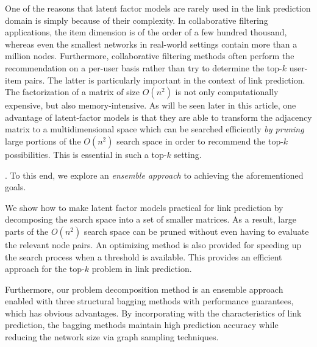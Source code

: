 One of the reasons that latent factor models are rarely used in the
link prediction domain is simply because of their complexity. In
collaborative filtering applications, the item dimension is of the
order of a few hundred thousand, whereas even the smallest networks
in real-world settings contain more than a million nodes.
Furthermore, collaborative filtering methods  often perform the
recommendation on a per-user basis rather than try to determine
the top-$k$ user-item pairs.  The latter is particularly important
in the context of link prediction. The factorization of a matrix of
size $O(n^2)$ is not only computationally expensive, but also
memory-intensive.  As will be seen later in this article, one advantage
of  latent-factor models is that they are able to  transform the
adjacency matrix to a multidimensional space which can be searched
efficiently {\em by pruning} large portions of the $O(n^2)$ search
space in order to recommend the top-$k$ possibilities.
This is essential in such a top-$k$ setting.

. To this end, we explore an {\em ensemble approach} to
achieving the aforementioned goals.

We show how to make latent factor models
practical for link prediction by decomposing the search space into a
 set of smaller matrices. As a result, large parts of the $O(n^2)$
search space can be pruned without even having to evaluate the
relevant node pairs. An optimizing method is also provided for
speeding up the search process when a threshold is available.
This provides an efficient approach for the
top-$k$ problem in link prediction.

Furthermore, our problem decomposition method is an ensemble approach
enabled with three structural bagging methods with performance guarantees,
which has obvious  advantages. By incorporating with the
characteristics of link prediction, the bagging methods maintain high prediction
accuracy while reducing the network size via graph sampling techniques.



